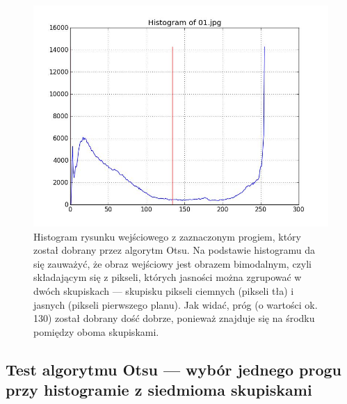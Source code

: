\documentclass[10pt]{llncs}
\begin{document}
\begin{figure}[h!]
  \centering
  \includegraphics[scale=.3, clip]{img/01_histogram.jpg}
	\caption[]
  {Histogram rysunku wejściowego z zaznaczonym progiem, który został dobrany przez algorytm Otsu. Na podstawie histogramu da się zauważyć, że obraz wejściowy jest obrazem bimodalnym, czyli składającym się z pikseli, których jasności można zgrupować w dwóch skupiskach --- skupisku pikseli ciemnych (pikseli tła) i jasnych (pikseli pierwszego planu). Jak widać, próg (o wartości ok. 130) został dobrany dość dobrze, ponieważ znajduje się na środku pomiędzy oboma skupiskami.}
\end{figure}

\clearpage
\subsection{Test algorytmu Otsu --- wybór jednego progu przy histogramie z siedmioma skupiskami}
\end{document}
